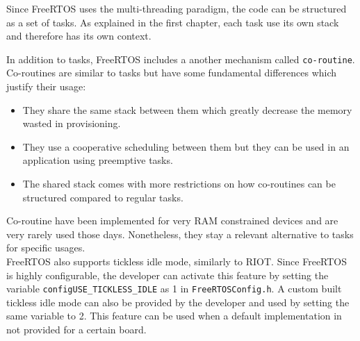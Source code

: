 Since FreeRTOS uses the multi-threading paradigm, the code can be structured as a set of tasks.
As explained in the first chapter, each task use its own stack and therefore has its own context.

In addition to tasks, FreeRTOS includes a another mechanism called \texttt{co-routine}.
Co-routines are similar to tasks but have some fundamental differences which justify their usage:
\begin{itemize}
    \item They share the same stack between them which greatly decrease the memory wasted in provisioning.
    \item They use a cooperative scheduling between them but they can be used in an application using preemptive tasks.
    \item The shared stack comes with more restrictions on how co-routines can be structured compared to regular tasks.
\end{itemize}
Co-routine have been implemented for very RAM constrained devices and are very rarely used those days.
Nonetheless, they stay a relevant alternative to tasks for specific usages.\\
FreeRTOS also supports tickless idle mode, similarly to RIOT.
Since FreeRTOS is highly configurable, the developer can activate this feature 
    by setting the variable \texttt{configUSE\_TICKLESS\_IDLE} as 1 in \texttt{FreeRTOSConfig.h}.
A custom built tickless idle mode can also be provided by the developer and used by setting the same variable to 2.
This feature can be used when a default implementation in not provided for a certain board.
